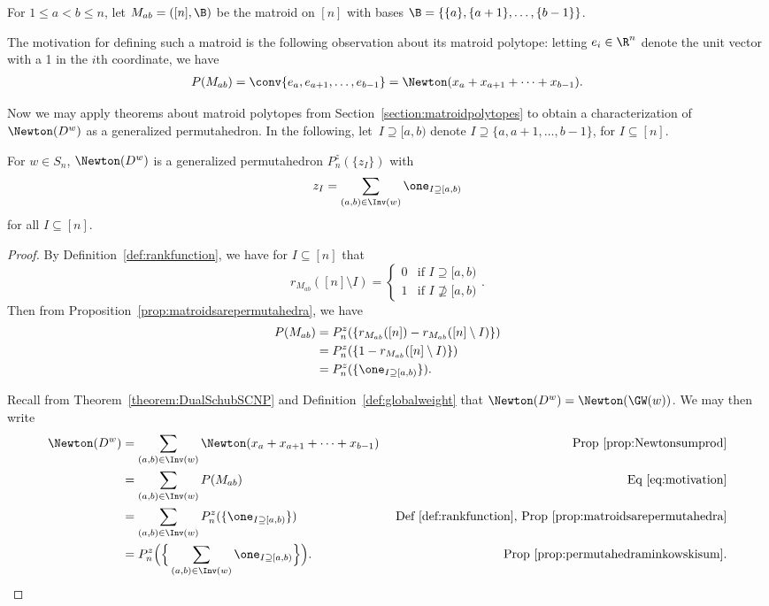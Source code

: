 \begin{defi}
    For $1\le a < b\le n$, let $M_{ab} = ([n], \B)$ be the matroid on $[n]$ with bases $\B = \{\{a\}, \{a + 1\}, \dots, \{b-1\}\}$.
\end{defi}
The motivation for defining such a matroid is the following observation about its matroid polytope:
letting $e_i\in\R^n$ denote the unit vector with a 1 in the $i$th coordinate, we have 
\begin{align}\label{eq:motivation}
    P(M_{ab}) = \conv\{e_a, e_{a+1}, \dots, e_{b-1}\} = \Newton(x_a + x_{a+1} + \cdots + x_{b-1}).
\end{align}

Now we may apply theorems about matroid polytopes from Section~\ref{section:matroidpolytopes} to obtain a characterization of $\Newton(D^w)$ as a generalized permutahedron.
In the following, let~$I\supseteq [a, b)$ denote $I\supseteq \{a, a+1, \dots, b-1\}$, for $I\subseteq [n]$. 

\begin{theorem}\label{thm:DualSchubertAsGeneralizedPermutahedron}
    For $w\in S_n$, $\Newton(D^w)$ is a generalized permutahedron $P_n^z(\{z_I\})$ with
    \[z_I = \sum_{(a, b)\in \Inv(w)}\one_{I\supseteq[a, b)}\]
    for all $I\subseteq [n]$.
\end{theorem}

\begin{proof}

    By Definition~\ref{def:rankfunction}, we have for $I\subseteq [n]$ that
    \[r_{M_{ab}}([n]\setminus I) = \begin{cases}
        0 & \text{if } I\supseteq [a, b)\\
        1 & \text{if } I\nsupseteq [a, b)
    \end{cases}.\]
    Then from Proposition~\ref{prop:matroidsarepermutahedra}, we have 
    \begin{align*}
        P(M_{ab}) &= P_n^z(\{r_{M_{ab}}([n]) - r_{M_{ab}}([n]\setminus I)\})\\
        &= P_n^z(\{1 - r_{M_{ab}}([n]\setminus I)\})\\
        &= P_n^z(\{\one_{I\supseteq [a, b)}\}).
    \end{align*}

    
    Recall from Theorem~\ref{theorem:DualSchubSCNP} and Definition~\ref{def:globalweight} that $\Newton(D^w) = \Newton(\GW(w))$. 
    We may then write 
    \begin{align*}
        \Newton(D^w) &= \sum_{(a, b)\in\Inv(w)} \Newton (x_a + x_{a+1} + \cdots + x_{b-1}) &\text{ Prop~\ref{prop:Newtonsumprod}}\\
        &= \sum_{(a, b)\in\Inv(w)} P(M_{ab}) &\text{ Eq~\ref{eq:motivation}} \\
        &= \sum_{(a, b)\in\Inv(w)} P_n^z(\{\one_{I\supseteq [a, b)}\}) &\text{ Def~\ref{def:rankfunction}, Prop~\ref{prop:matroidsarepermutahedra}} \\
        &= P_n^z\Big(\Big\{\sum_{(a, b)\in \Inv(w)}\one_{I\supseteq[a, b)}\Big\}\Big). & \text{ Prop~\ref{prop:permutahedraminkowskisum}}.
    \end{align*}
\end{proof}

